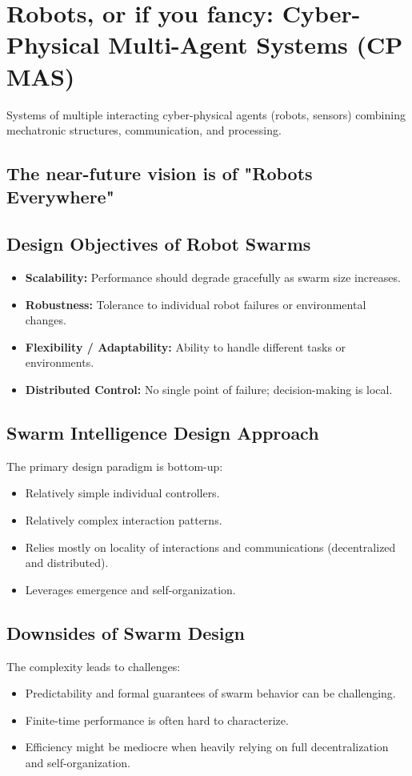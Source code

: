 \section*{Robots, or if you fancy: Cyber-Physical Multi-Agent Systems (CP MAS)}
Systems of multiple interacting cyber-physical agents (robots, sensors) combining mechatronic structures, communication, and processing.

\subsection*{The near-future vision is of "Robots Everywhere"}

\subsection*{Design Objectives of Robot Swarms}
\begin{itemize}
    \item \textbf{Scalability:} Performance should degrade gracefully as swarm size increases.
    \item \textbf{Robustness:} Tolerance to individual robot failures or environmental changes.
    \item \textbf{Flexibility / Adaptability:} Ability to handle different tasks or environments.
    \item \textbf{Distributed Control:} No single point of failure; decision-making is local.
\end{itemize}
\subsection*{Swarm Intelligence Design Approach}
The primary design paradigm is bottom-up:

\begin{itemize}
    \item Relatively simple individual controllers.
    \item Relatively complex interaction patterns.
    \item Relies mostly on locality of interactions and communications (decentralized and distributed).
    \item Leverages emergence and self-organization.
\end{itemize}

\subsection*{Downsides of Swarm Design}
The complexity leads to challenges:
\begin{itemize}
    \item Predictability and formal guarantees of swarm behavior can be challenging.
    \item Finite-time performance is often hard to characterize.
    \item Efficiency might be mediocre when heavily relying on full decentralization and self-organization.
\end{itemize}


